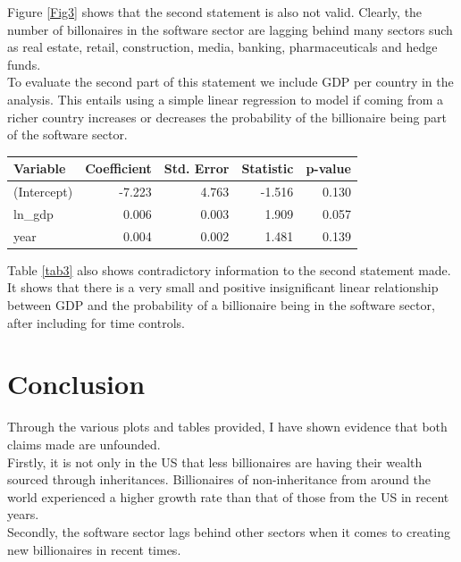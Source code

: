 \documentclass[11pt,preprint]{elsarticle}
\let\origtable\table
\let\endorigtable\endtable
\renewenvironment{table}[1][2] {
    \expandafter\origtable\expandafter[H]
} {
    \endorigtable
}
\numberwithin{equation}{section}
\numberwithin{figure}{section}
\numberwithin{table}{section}
\begin{document}
Figure \ref{Fig3} shows that the second statement is also not valid.
Clearly, the number of billonaires in the software sector are lagging
behind many sectors such as real estate, retail, construction, media,
banking, pharmaceuticals and hedge funds.\\
To evaluate the second part of this statement we include GDP per country
in the analysis. This entails using a simple linear regression to model
if coming from a richer country increases or decreases the probability
of the billionaire being part of the software sector.

\begin{table}
\centering
\caption{\label{tab:unnamed-chunk-6}Table showing results of regression of log of GDP on the probability of being in the software sector \label{tab3}}
\centering
\begin{tabular}[t]{l|r|r|r|r}
\hline
Variable & Coefficient & Std. Error & Statistic & p-value\\
\hline
(Intercept) & -7.223 & 4.763 & -1.516 & 0.130\\
\hline
ln\_gdp & 0.006 & 0.003 & 1.909 & 0.057\\
\hline
year & 0.004 & 0.002 & 1.481 & 0.139\\
\hline
\end{tabular}
\end{table}

Table \ref{tab3} also shows contradictory information to the second
statement made. It shows that there is a very small and positive
insignificant linear relationship between GDP and the probability of a
billionaire being in the software sector, after including for time
controls.

\section{Conclusion}\label{conclusion}

Through the various plots and tables provided, I have shown evidence
that both claims made are unfounded.\\
Firstly, it is not only in the US that less billionaires are having
their wealth sourced through inheritances. Billionaires of
non-inheritance from around the world experienced a higher growth rate
than that of those from the US in recent years.\\
Secondly, the software sector lags behind other sectors when it comes to
creating new billionaires in recent times.


\end{document}
